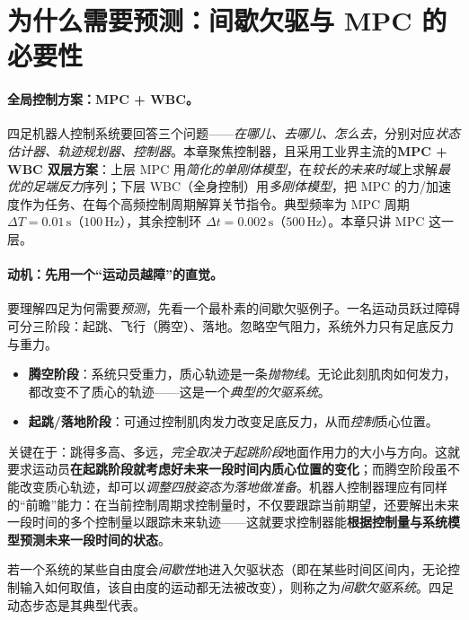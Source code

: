 \section{为什么需要预测：间歇欠驱与 MPC 的必要性}
\label{sec:why-predict}

\paragraph{全局控制方案：MPC + WBC。}
四足机器人控制系统要回答三个问题——\emph{在哪儿、去哪儿、怎么去}，分别对应\emph{状态估计器、轨迹规划器、控制器}\cite{dicarlo2018cheetah}。本章聚焦控制器，且采用工业界主流的\textbf{MPC + WBC 双层方案}：上层 MPC 用\emph{简化的单刚体模型}，在\emph{较长的未来时域}上求解\emph{最优的足端反力}序列；下层 WBC（全身控制）用\emph{多刚体模型}，把 MPC 的力/加速度作为任务、在每个高频控制周期解算关节指令。典型频率为 MPC 周期 $\Delta T=0.01\,\mathrm{s}$（$100\,\mathrm{Hz}$），其余控制环 $\Delta t=0.002\,\mathrm{s}$（$500\,\mathrm{Hz}$）\cite{dicarlo2018cheetah}。本章只讲 MPC 这一层。

\paragraph{动机：先用一个“运动员越障”的直觉。}
要理解四足为何需要\emph{预测}，先看一个最朴素的间歇欠驱例子。一名运动员跃过障碍可分三阶段：起跳、飞行（腾空）、落地。忽略空气阻力，系统外力只有足底反力与重力。
\begin{itemize}
  \item \textbf{腾空阶段}：系统只受重力，质心轨迹是一条\emph{抛物线}。无论此刻肌肉如何发力，都改变不了质心的轨迹——这是一个\emph{典型的欠驱系统}。
  \item \textbf{起跳/落地阶段}：可通过控制肌肉发力改变足底反力，从而\emph{控制}质心位置。
\end{itemize}
关键在于：跳得多高、多远，\emph{完全取决于起跳阶段}地面作用力的大小与方向。这就要求运动员\textbf{在起跳阶段就考虑好未来一段时间内质心位置的变化}；而腾空阶段虽不能改变质心轨迹，却可以\emph{调整四肢姿态为落地做准备}。机器人控制器理应有同样的“前瞻”能力：在当前控制周期求控制量时，不仅要跟踪当前期望，还要解出未来一段时间的多个控制量以跟踪未来轨迹——这就要求控制器能\textbf{根据控制量与系统模型预测未来一段时间的状态}\cite{dicarlo2018cheetah}。

\begin{definition}[间歇欠驱系统]\label{def:underactuated}
若一个系统的某些自由度会\emph{间歇性}地进入欠驱状态（即在某些时间区间内，无论控制输入如何取值，该自由度的运动都无法被改变），则称之为\emph{间歇欠驱系统}。四足动态步态是其典型代表。
\end{definition}

